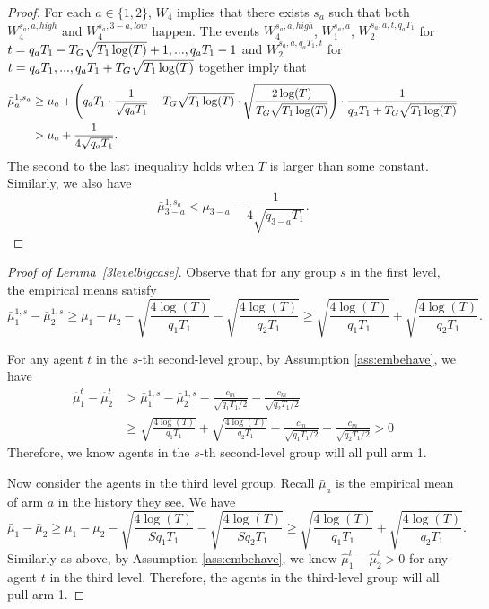 \begin{proof}
  For each $a \in \{1,2\}$, $W_4$ implies that there exists $s_a$ such
  that both $W_4^{s_a,a,high}$ and $W_4^{s_a,3-a,low}$ happen.  The
  events $W_4^{s_a,a,high}$, $W_1^{s_a,a}$, $W_2^{s_a,a,t, q_aT_1}$
  for $t = q_a T_1- T_G \sqrt{T_1\log(T)}+1, ...,q_aT_1-1$ and
  $W_2^{s_a,a,q_aT_1,t}$ for
  $t= q_aT_1,...,q_a T_1+ T_G \sqrt{T_1\log(T)}$ together imply that
\begin{align*}
\bar{\mu}_a ^{1,s_a} &\geq \mu_a + \left(q_aT_1 \cdot \frac{1}{\sqrt{q_aT_1}} - T_G \sqrt{T_1\log(T)} \cdot \sqrt{\frac{2\log(T)}{ T_G \sqrt{T_1\log(T)}}} \right) \cdot \frac{1}{q_a T_1+ T_G \sqrt{T_1\log(T)}} \\
&> \mu_a + \frac{1}{4\sqrt{q_aT_1}}.
\end{align*}
The second to the last inequality holds when $T$ is larger than some constant.
Similarly, we also have
\[
\bar{\mu}_{3-a} ^{1,s_a} < \mu_{3-a}   - \frac{1}{4\sqrt{q_{3-a} T_1}}.
\]
\end{proof}



\begin{proof}[Proof of Lemma~\ref{3levelbigcase}]
  Observe that for any group $s$ in the first level, the empirical
  means satisfy
\[
\bar{\mu}_1^{1,s} - \bar{\mu}_2^{1,s} \geq \mu_1 -\mu_2 - \sqrt{\frac{4\log(T)}{q_1T_1}} - \sqrt{\frac{4\log(T)}{q_2T_1}} \geq  \sqrt{\frac{4\log(T)}{q_1T_1}} + \sqrt{\frac{4\log(T)}{q_2T_1}}.
\]


For any agent $t$ in the $s$-th second-level group, by Assumption \ref{ass:embehave}, we have
\begin{align*}
\hat{\mu}_1^t - \hat{\mu}_2^t &>\bar{\mu}_1^{1,s} - \bar{\mu}_2^{1,s} - \frac{c_m}{\sqrt{q_1T_1/2}} - \frac{c_m}{\sqrt{q_2T_1/2}}\\
&\geq  \sqrt{\frac{4\log(T)}{q_1T_1}} + \sqrt{\frac{4\log(T)}{q_2T_1}}- \frac{c_m}{\sqrt{q_1T_1/2}} - \frac{c_m}{\sqrt{q_2T_1/2}} > 0
\end{align*}
Therefore, we know agents in the $s$-th second-level group will all pull arm 1.

Now consider the agents in the third level group. Recall $\bar{\mu}_a$
is the empirical mean of arm $a$ in the history they see. We have
\[
\bar{\mu}_1 - \bar{\mu}_2 \geq \mu_1 -\mu_2 - \sqrt{\frac{4\log(T)}{Sq_1T_1}} - \sqrt{\frac{4\log(T)}{Sq_2T_1}} \geq  \sqrt{\frac{4\log(T)}{q_1T_1}} 
+ \sqrt{\frac{4\log(T)}{q_2T_1}}.
\]
Similarly as above, by Assumption \ref{ass:embehave}, we know
$\hat{\mu}_1^t - \hat{\mu}_2^t > 0$ for any agent $t$ in the third
level. Therefore, the agents in the third-level group will all pull
arm 1.  
\end{proof}



